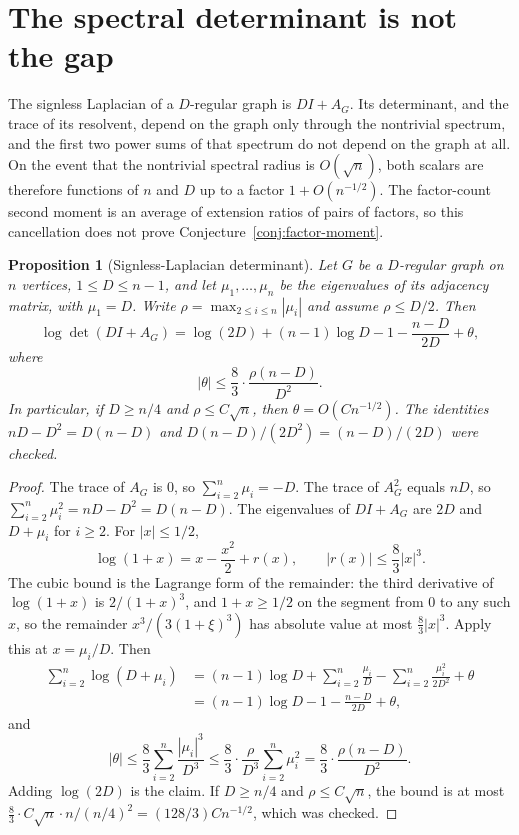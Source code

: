 \documentclass[11pt]{article}
\newtheorem{proposition}[theorem]{Proposition}
\begin{document}
\section{The spectral determinant is not the gap}
\label{sec:spectral-det}

The signless Laplacian of a \(D\)-regular graph is \(DI+A_G\).
Its determinant, and the trace of its resolvent, depend on the graph only
through the nontrivial spectrum, and the first two power sums of that spectrum
do not depend on the graph at all.
On the event that the nontrivial spectral radius is \(O(\sqrt{n})\), both
scalars are therefore functions of \(n\) and \(D\) up to a factor
\(1+O(n^{-1/2})\).
The factor-count second moment is an average of extension ratios of pairs of
factors, so this cancellation does not prove
Conjecture~\ref{conj:factor-moment}.

\begin{proposition}[Signless-Laplacian determinant]
\label{prop:spectral-det}
Let \(G\) be a \(D\)-regular graph on \(n\) vertices, \(1\le D\le n-1\), and let
\(\mu_1,\ldots,\mu_n\) be the eigenvalues of its adjacency matrix, with
\(\mu_1=D\).
Write \(\rho=\max_{2\le i\le n}|\mu_i|\) and assume \(\rho\le D/2\).
Then
\[
\log\det(DI+A_G)
=
\log(2D)+(n-1)\log D-1-\frac{n-D}{2D}+\theta,
\]
where
\[
|\theta|
\le
\frac83\cdot\frac{\rho(n-D)}{D^2}.
\]
In particular, if \(D\ge n/4\) and \(\rho\le C\sqrt{n}\), then
\(\theta=O(C n^{-1/2})\).
The identities \(nD-D^2=D(n-D)\) and
\(D(n-D)/(2D^2)=(n-D)/(2D)\) were checked.
\end{proposition}

\begin{proof}
The trace of \(A_G\) is \(0\), so \(\sum_{i=2}^n\mu_i=-D\).
The trace of \(A_G^2\) equals \(nD\), so
\(\sum_{i=2}^n\mu_i^2=nD-D^2=D(n-D)\).
The eigenvalues of \(DI+A_G\) are \(2D\) and \(D+\mu_i\) for \(i\ge 2\).
For \(|x|\le 1/2\),
\[
\log(1+x)=x-\frac{x^2}{2}+r(x),
\qquad
|r(x)|\le\frac83|x|^3.
\]
The cubic bound is the Lagrange form of the remainder: the third derivative of
\(\log(1+x)\) is \(2/(1+x)^3\), and \(1+x\ge 1/2\) on the segment from \(0\) to any
such \(x\), so the remainder \(x^3/(3(1+\xi)^3)\) has absolute value at most
\(\tfrac83|x|^3\).
Apply this at \(x=\mu_i/D\). Then
\begin{align*}
\sum_{i=2}^n\log(D+\mu_i)
&=
(n-1)\log D+\sum_{i=2}^n\frac{\mu_i}{D}
-\sum_{i=2}^n\frac{\mu_i^2}{2D^2}+\theta\\
&=
(n-1)\log D-1-\frac{n-D}{2D}+\theta,
\end{align*}
and
\[
|\theta|
\le
\frac83\sum_{i=2}^n\frac{|\mu_i|^3}{D^3}
\le
\frac83\cdot\frac{\rho}{D^3}\sum_{i=2}^n\mu_i^2
=
\frac83\cdot\frac{\rho(n-D)}{D^2}.
\]
Adding \(\log(2D)\) is the claim.
If \(D\ge n/4\) and \(\rho\le C\sqrt{n}\), the bound is at most
\(\tfrac83\cdot C\sqrt{n}\cdot n/(n/4)^2=(128/3)C n^{-1/2}\), which was checked.
\end{proof}
\end{document}
